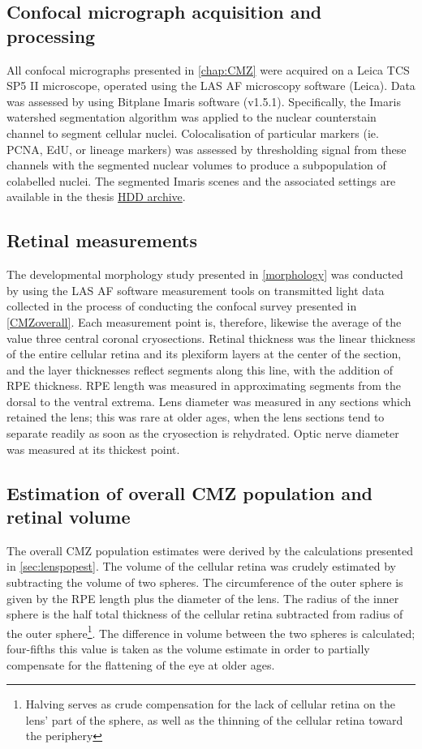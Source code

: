 \subsection{Confocal micrograph acquisition and processing}
All confocal micrographs presented in \autoref{chap:CMZ} were acquired on a Leica TCS SP5 II microscope, operated using the LAS AF microscopy software (Leica). Data was assessed by using Bitplane Imaris software (v1.5.1). Specifically, the Imaris watershed segmentation algorithm was applied to the nuclear counterstain channel to segment cellular nuclei. Colocalisation of particular markers (ie. PCNA, EdU, or lineage markers) was assessed by thresholding signal from these channels with the segmented nuclear volumes to produce a subpopulation of colabelled nuclei. The segmented Imaris scenes and the associated settings are available in the thesis \hyperref[sec:archive]{HDD archive}.

\subsection{Retinal measurements}
\label{ssec:CMZretmeas}
The developmental morphology study presented in \autoref{morphology} was conducted by using the LAS AF software measurement tools on transmitted light data collected in the process of conducting the confocal survey presented in \autoref{CMZoverall}. Each measurement point is, therefore, likewise the average of the value three central coronal cryosections. Retinal thickness was the linear thickness of the entire cellular retina and its plexiform layers at the center of the section, and the layer thicknesses reflect segments along this line, with the addition of RPE thickness. RPE length was measured in approximating segments from the dorsal to the ventral extrema. Lens diameter was measured in any sections which retained the lens; this was rare at older ages, when the lens sections tend to separate readily as soon as the cryosection is rehydrated. Optic nerve diameter was measured at its thickest point.

\subsection{Estimation of overall CMZ population and retinal volume}
\label{ssec:CMZpopvolest}
The overall CMZ population estimates were derived by the calculations presented in \autoref{sec:lenspopest}. The volume of the cellular retina was crudely estimated by subtracting the volume of two spheres. The circumference of the outer sphere is given by the RPE length plus the diameter of the lens. The radius of the inner sphere is the half total thickness of the cellular retina subtracted from radius of the outer sphere\footnote{Halving serves as crude compensation for the lack of cellular retina on the lens' part of the sphere, as well as the thinning of the cellular retina toward the periphery}. The difference in volume between the two spheres is calculated; four-fifths this value is taken as the volume estimate in order to partially compensate for the flattening of the eye at older ages.

